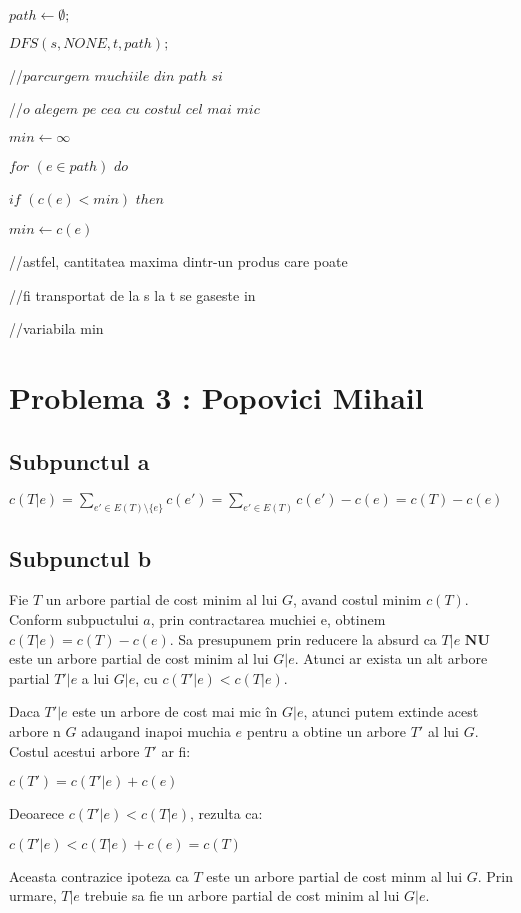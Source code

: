 \documentclass{article}
\begin{document}
{{{    \\
    \par $path \leftarrow \emptyset;$
    \par $DFS(s, NONE, t, path);$
    \\
    \par //$parcurgem$ $muchiile$ $din$ $path$ $si$ 
    \par //$o$ $alegem$ $pe$ $cea$ $cu$ $costul$ $cel$ $mai$ $mic$
    \par $min \leftarrow \infty$
    \par $for$  $(e\in path)$ $do$
    \par \hspace*{1cm} $if$ $(c(e)<min)$ $then$
    \par \hspace*{1.5cm} $min \leftarrow c(e)$
    \par //astfel, cantitatea maxima dintr-un produs care poate
    \par //fi transportat de la s la t se gaseste in 
    \par //variabila min 

}

\section*{\fontsize{20}{50}\selectfont Problema 3 : Popovici Mihail}
\subsection*{\fontsize{16}{30}\selectfont Subpunctul a}
{\fontsize{14}{16}\selectfont 

\centerline {$ c(T|e) = \sum_{ e'\in E(T)\setminus \lbrace e \rbrace } c(e') = \sum_{ e'\in E(T) } c(e') - c(e) = c(T) - c(e)$ }
}

\subsection*{\fontsize{16}{30}\selectfont Subpunctul b}
{\fontsize{14}{16}\selectfont 
    Fie $T$ un arbore partial de cost minim al lui $G$, avand costul minim $c(T)$. Conform subpuctului $a$, prin contractarea muchiei e, obtinem $c(T|e) = c(T) - c(e)$.
    Sa presupunem prin reducere la absurd ca $T|e$ $\mathbf{N} \mathbf{U}$ este un arbore partial de cost minim al lui $G|e$. Atunci ar exista un alt arbore partial $T'|e$ a lui $G|e$, cu $c(T'|e) < c(T|e)$.
    \par Daca $T'|e$ este un arbore de cost mai mic în $G|e$, atunci putem extinde acest arbore n $G$ adaugand inapoi muchia $e$ pentru a obtine un arbore $T'$ al lui $G$. Costul acestui arbore $T'$ ar fi:
    \par \centerline { $c(T') = c(T'|e) + c(e)$ }
    \par Deoarece $c(T'|e) < c(T|e)$, rezulta ca:
    \par \centerline {$c(T'|e) < c(T|e) + c(e) = c(T) $}
    \par Aceasta contrazice ipoteza ca $T$ este un arbore partial de cost minm al lui $G$. Prin urmare, $T|e$ trebuie sa fie un arbore partial de cost minim al lui $G|e$.
    }

}}
\end{document}
